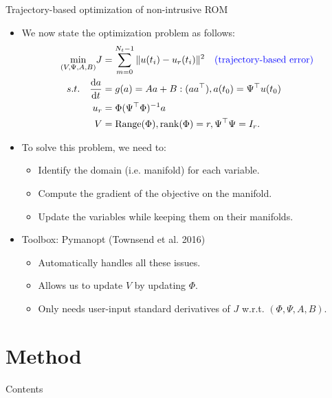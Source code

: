 \documentclass[presentation]{beamer}
\begin{document}
\begin{frame}[label={sec:org7be6611}]{Trajectory-based optimization of non-intrusive ROM}
\begin{itemize}[<+->]
\item We now state the optimization problem as follows:
\begin{subequations}
\label{eq:5}
\begin{align}
  \underset{(V, \Psi, A, B)}{\min} J &= \sum_{m = 0}^{N_{t} - 1}\|u(t_{i}) - u_{r}(t_{i})\|^{2} \quad \text{\textcolor{blue}{(trajectory-based error)}}\\
  s.t. \quad \frac{\mathrm{d}a}{\mathrm{d}t} &= g(a) = Aa + B:(aa^{\top}), a(t_{0}) = \Psi^{\top}u(t_{0})\\
  u_{r} &= \Phi(\Psi^{\top}\Phi)^{-1}a\\
  V &= \mathrm{Range}(\Phi), \mathrm{rank}(\Phi) = r, \Psi^{\top}\Psi = I_{r}.
\end{align}
\end{subequations}
\item To solve this problem, we need to:
\begin{itemize}
\item Identify the domain (i.e. manifold) for each variable.
\item Compute the gradient of the objective on the manifold.
\item Update the variables while keeping them on their manifolds.
\end{itemize}

\item Toolbox: Pymanopt (Townsend et al. 2016)
\begin{itemize}
\item Automatically handles all these issues.
\item Allows us to update \(V\) by updating \(\Phi\).
\item Only needs user-input standard derivatives of \(J\) w.r.t. \((\Phi, \Psi, A, B)\).
\end{itemize}
\end{itemize}
\end{frame}

\section{Method}
\label{sec:org6066e78}
\begin{frame}{Contents}
\end{frame}
\end{document}
